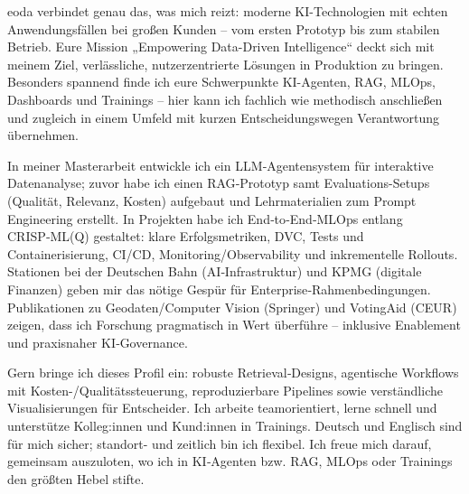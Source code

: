 eoda verbindet genau das, was mich reizt: moderne KI-Technologien mit echten Anwendungsfällen bei großen Kunden – vom ersten Prototyp bis zum stabilen Betrieb. Eure Mission „Empowering Data-Driven Intelligence“ deckt sich mit meinem Ziel, verlässliche, nutzerzentrierte Lösungen in Produktion zu bringen. Besonders spannend finde ich eure Schwerpunkte KI-Agenten, RAG, MLOps, Dashboards und Trainings – hier kann ich fachlich wie methodisch anschließen und zugleich in einem Umfeld mit kurzen Entscheidungswegen Verantwortung übernehmen.

In meiner Masterarbeit entwickle ich ein LLM‑Agentensystem für interaktive Datenanalyse; zuvor habe ich einen RAG‑Prototyp samt Evaluations-Setups (Qualität, Relevanz, Kosten) aufgebaut und Lehrmaterialien zum Prompt Engineering erstellt. In Projekten habe ich End‑to‑End‑MLOps entlang CRISP‑ML(Q) gestaltet: klare Erfolgsmetriken, DVC, Tests und Containerisierung, CI/CD, Monitoring/Observability und inkrementelle Rollouts. Stationen bei der Deutschen Bahn (AI‑Infrastruktur) und KPMG (digitale Finanzen) geben mir das nötige Gespür für Enterprise‑Rahmenbedingungen. Publikationen zu Geodaten/Computer Vision (Springer) und VotingAid (CEUR) zeigen, dass ich Forschung pragmatisch in Wert überführe – inklusive Enablement und praxisnaher KI‑Governance.

Gern bringe ich dieses Profil ein: robuste Retrieval‑Designs, agentische Workflows mit Kosten-/Qualitätssteuerung, reproduzierbare Pipelines sowie verständliche Visualisierungen für Entscheider. Ich arbeite teamorientiert, lerne schnell und unterstütze Kolleg:innen und Kund:innen in Trainings. Deutsch und Englisch sind für mich sicher; standort- und zeitlich bin ich flexibel. Ich freue mich darauf, gemeinsam auszuloten, wo ich in KI‑Agenten bzw. RAG, MLOps oder Trainings den größten Hebel stifte.
